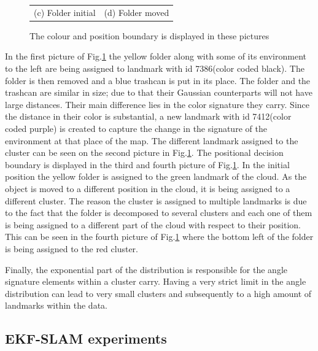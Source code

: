 \documentclass[twoside,hidelinks]{article}
\begin{document}
\begin{figure}
\begin{tabular}{cc}
(c) Folder initial  & (d) Folder moved \\[6pt]
\end{tabular}
\caption{The colour and position boundary is displayed in these pictures}
  \label{pip:bounds}
\end{figure}

In the first picture of Fig.\ref{pip:bounds} the yellow folder along with some of its environment to the left are being assigned to landmark with id 7386(color coded black). The folder is then removed and a blue trashcan is put in its place. The folder and the trashcan are similar in size; due to that their Gaussian counterparts will not have large distances. Their main difference lies in the color signature they carry. Since the distance in their color is substantial, a new landmark with id 7412(color coded purple) is created to capture the change in the signature of the environment at that place of the map. The different landmark assigned to the cluster can be seen on the second picture in Fig.\ref{pip:bounds}. The positional decision boundary is displayed in the third and fourth picture of Fig.\ref{pip:bounds}. In the initial position the yellow folder is assigned to the green landmark of the cloud. As the object is moved to a different position in the cloud, it is being assigned to a different cluster. The reason the cluster is assigned to multiple landmarks is due to the fact that the folder is decomposed to several clusters and each one of them is being assigned to a different part of the cloud with respect to their position. This can be seen in the fourth picture of Fig.\ref{pip:bounds} where the bottom left of the folder is being assigned to the red cluster.

Finally, the exponential part of the distribution is responsible for the angle signature elements within a cluster carry. Having a very strict limit in the angle distribution can lead to very small clusters and subsequently to a high amount of landmarks within the data.

\subsection{EKF-SLAM experiments}
\end{document}

